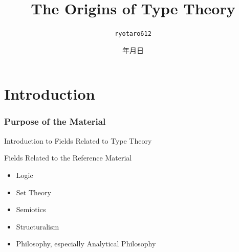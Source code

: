 \documentclass[unicode, 14pt, aspectratio=169]{beamer}
\date{\number\year 年\number\month 月\number\day 日}
\title{The Origins of Type Theory}
\author{\texttt{ryotaro612}}
\begin{document}
\begin{frame}
\titlepage
\end{frame}
\section{Introduction}
\begin{frame}
  \frametitle{Purpose of the Material}
  {\large Introduction to Fields Related to Type Theory}
  \par
  \vspace{16pt}
  Fields Related to the Reference Material
  \begin{itemize}
  \item Logic
  \item Set Theory
  \item Semiotics
  \item Structuralism
  \item Philosophy, especially Analytical Philosophy
  \end{itemize}
\end{frame}
\end{document}
